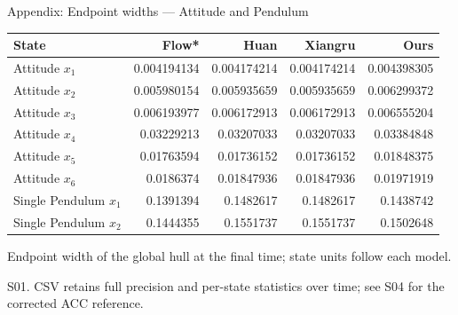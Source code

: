 \documentclass[aspectratio=169,11pt]{beamer}
\newcommand{\src}[1]{\par\vfill{\fontsize{7}{9}\selectfont\color{gray}#1\par}}
\begin{document}
\begin{frame}[t]{Appendix: Endpoint widths — Attitude and Pendulum}
\relax
\relax
{\footnotesize\setlength{\tabcolsep}{3.2pt}\renewcommand{\arraystretch}{1.18}
\noindent\begin{tabular*}{\linewidth}{@{\extracolsep{\fill}}lrrrr@{}}\toprule
\textbf{State} & \textbf{Flow*} & \textbf{Huan} & \textbf{Xiangru} & \textbf{Ours}\\ \midrule
Attitude \(x_1\) & 0.004194134 & 0.004174214 & 0.004174214 & 0.004398305\\
Attitude \(x_2\) & 0.005980154 & 0.005935659 & 0.005935659 & 0.006299372\\
Attitude \(x_3\) & 0.006193977 & 0.006172913 & 0.006172913 & 0.006555204\\
Attitude \(x_4\) & 0.03229213 & 0.03207033 & 0.03207033 & 0.03384848\\
Attitude \(x_5\) & 0.01763594 & 0.01736152 & 0.01736152 & 0.01848375\\
Attitude \(x_6\) & 0.0186374 & 0.01847936 & 0.01847936 & 0.01971919\\
Single Pendulum \(x_1\) & 0.1391394 & 0.1482617 & 0.1482617 & 0.1438742\\
Single Pendulum \(x_2\) & 0.1444355 & 0.1551737 & 0.1551737 & 0.1502648\\
\bottomrule\end{tabular*}\par{}}\vspace{0.25cm}Endpoint width of the global hull at the final time; state units follow each model.
\src{S01. CSV retains full precision and per-state statistics over time; see S04 for the corrected ACC reference.}
\end{frame}
\end{document}
